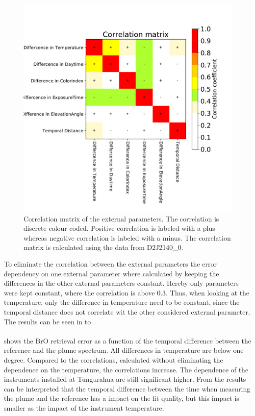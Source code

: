 \documentclass  [
  paper    = a4,
  BCOR     = 10mm,
  twoside,
  fontsize = 12pt,
  fleqn,
  toc      = bibnumbered,
  toc      = listofnumbered,
  numbers  = noendperiod,
  headings = normal,
  listof   = leveldown,
  version  = 3.03
]                                       {scrreprt}
\begin{document}
	\begin{figure}
		\centering
		\includegraphics[width=1\linewidth]{Bilder/varCorrelation_matrix}
		\caption{Correlation matrix of the external parameters. The correlation is discrete colour coded. Positive correlation is labeled with a plus whereas negative correlation is labeled with a minus. The correlation matrix is calculated using the data from D2J2140\_0.}
		\label{fig:varcorrelationmatrix}
	\end{figure}
%
	To eliminate the correlation between the external parameters the   error dependency on one external parameter where calculated by keeping the differences in the other external parameters constant. Hereby only parameters were kept constant, where the correlation is above 0.3. Thus, when looking at the temperature, only the difference in temperature need to be constant, since the temporal distance does not correlate wit the other considered external parameter. The results can be seen in  to .\\
	\\
	 shows the BrO retrieval error as a function of the temporal difference between the reference and the plume spectrum. All differences in temperature are below one degree. Compared to the correlations, calculated without eliminating the dependence on the temperature, the correlations increase. The dependence of the instruments installed at Tungurahua are still significant higher. From the results can be interpreted that the temporal difference between the time when measuring the plume and the reference has a impact on the fit quality, but this impact is smaller as the impact of the instrument temperature.\\
\end{document}
